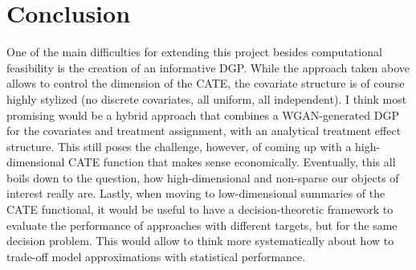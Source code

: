 \documentclass[11pt, a4paper, leqno]{article}
\begin{document}
\section{Conclusion}
One of the main difficulties for extending this project besides computational feasibility is the creation of an informative DGP\@.
While the approach taken above allows to control the dimension of the CATE, the covariate structure is of course highly stylized (no discrete covariates, all uniform, all independent).
I think most promising would be a hybrid approach that combines a WGAN-generated DGP for the covariates and treatment assignment, with an analytical treatment effect structure.
This still poses the challenge, however, of coming up with a high-dimensional CATE function that makes sense economically.
Eventually, this all boils down to the question, how high-dimensional and non-sparse our objects of interest really are.
Lastly, when moving to low-dimensional summaries of the CATE functional, it would be useful to have a decision-theoretic framework to evaluate the performance of approaches with different targets, but for the same decision problem.
This would allow to think more systematically about how to trade-off model approximations with statistical performance.

\clearpage
\newpage

\printbibliography
{}


\end{document}
